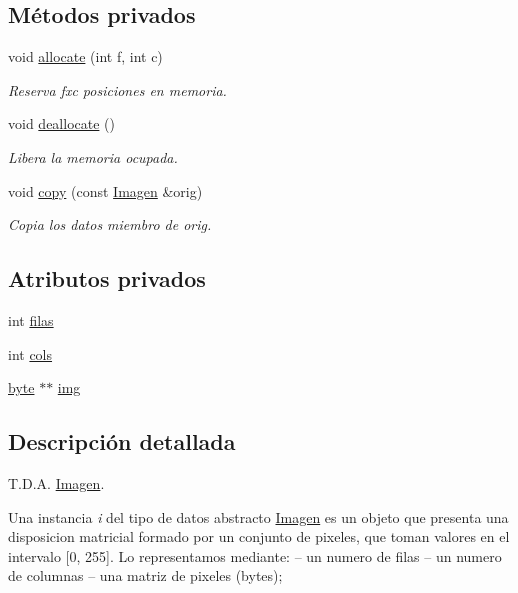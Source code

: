 \subsection*{Métodos privados}
\begin{DoxyCompactItemize}
\item 
void \hyperlink{classImagen_a0d06b8762c40ab6b6d1da6d45c2024da}{allocate} (int f, int c)
\begin{DoxyCompactList}\small\item\em Reserva fxc posiciones en memoria. \end{DoxyCompactList}\item 
void \hyperlink{classImagen_a50bdabe1d37bc418b2076e70a5a8402c}{deallocate} ()
\begin{DoxyCompactList}\small\item\em Libera la memoria ocupada. \end{DoxyCompactList}\item 
void \hyperlink{classImagen_af9c0798c6c770482eca1cb67e7e1ce9c}{copy} (const \hyperlink{classImagen}{Imagen} \&orig)
\begin{DoxyCompactList}\small\item\em Copia los datos miembro de orig. \end{DoxyCompactList}\end{DoxyCompactItemize}
\subsection*{Atributos privados}
\begin{DoxyCompactItemize}
\item 
int \hyperlink{classImagen_a7f15719f14cd934dfcbd68c287bbbe8b}{filas}
\item 
int \hyperlink{classImagen_a0a457e0727a540c60dcdf02410e25be9}{cols}
\item 
\hyperlink{imagen_8h_a0c8186d9b9b7880309c27230bbb5e69d}{byte} $\ast$$\ast$ \hyperlink{classImagen_a2a1c6ab009c2358bbdf7134c9e7f52d6}{img}
\end{DoxyCompactItemize}


\subsection{Descripción detallada}
T.\+D.\+A. \hyperlink{classImagen}{Imagen}. 

Una instancia {\itshape i} del tipo de datos abstracto {\ttfamily \hyperlink{classImagen}{Imagen}} es un objeto que presenta una disposicion matricial formado por un conjunto de pixeles, que toman valores en el intervalo \mbox{[}0, 255\mbox{]}. Lo representamos mediante\+: -- un numero de filas -- un numero de columnas -- una matriz de pixeles (bytes);

